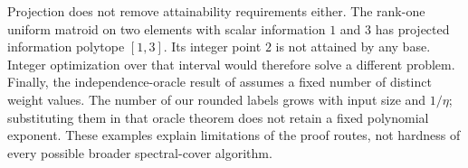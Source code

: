 Projection does not remove attainability requirements either. The rank-one
uniform matroid on two elements with scalar information $1$ and $3$ has
projected information polytope $[1,3]$. Its integer point $2$ is not attained
by any base. Integer optimization over that interval would therefore solve
a different problem. Finally, the independence-oracle result of
\citet[Theorem 1.1]{Berstein2008} assumes a fixed number of distinct weight
values. The number of our rounded labels grows with input size and
$1/\eta$; substituting them in that oracle theorem does not retain a fixed
polynomial exponent. These examples explain limitations of the proof routes,
not hardness of every possible broader spectral-cover algorithm.
